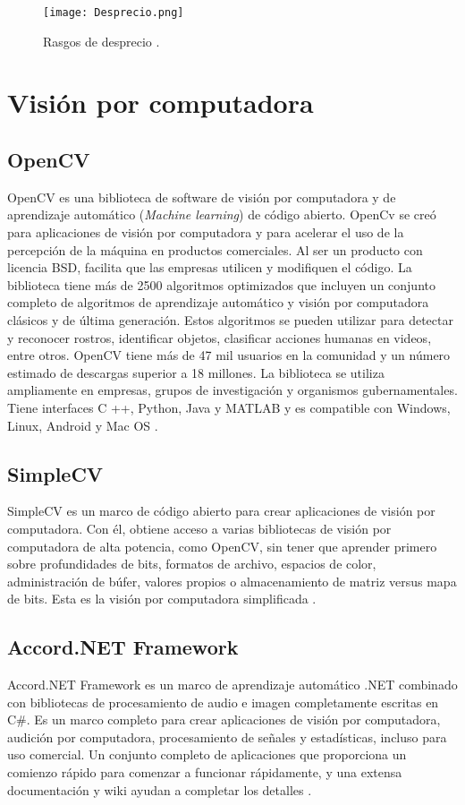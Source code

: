 \begin{figure}[h]
    \centering
    \texttt{[image: Desprecio.png]}
    \caption{Rasgos de desprecio \cite{ReconocerLasEmociones}.}
    \label{fig:Desprecio}
\end{figure}

\section*{Visión por computadora}
\subsection*{OpenCV}
OpenCV es una biblioteca de software de visión por computadora y de aprendizaje automático (\textit{Machine learning}) de código abierto. OpenCv se creó para aplicaciones de visión por computadora y para acelerar el uso de la percepción de la máquina en productos comerciales. Al ser un producto con licencia BSD, facilita que las empresas utilicen y modifiquen el código. La biblioteca tiene más de 2500 algoritmos optimizados que incluyen un conjunto completo de algoritmos de aprendizaje automático y visión por computadora clásicos y de última generación. Estos algoritmos se pueden utilizar para detectar y reconocer rostros, identificar objetos, clasificar acciones humanas en videos, entre otros. OpenCV tiene más de 47 mil usuarios en la comunidad y un número estimado de descargas superior a 18 millones. La biblioteca se utiliza ampliamente en empresas, grupos de investigación y organismos gubernamentales. Tiene interfaces C ++, Python, Java y MATLAB y es compatible con Windows, Linux, Android y Mac OS \cite{OpenCV}.

\subsection*{SimpleCV}
SimpleCV es un marco de código abierto para crear aplicaciones de visión por computadora. Con él, obtiene acceso a varias bibliotecas de visión por computadora de alta potencia, como OpenCV, sin tener que aprender primero sobre profundidades de bits, formatos de archivo, espacios de color, administración de búfer, valores propios o almacenamiento de matriz versus mapa de bits. Esta es la visión por computadora simplificada \cite{SimpleCV}.

\subsection*{Accord.NET Framework}
Accord.NET Framework es un marco de aprendizaje automático .NET combinado con bibliotecas de procesamiento de audio e imagen completamente escritas en C\#. Es un marco completo para crear aplicaciones de visión por computadora, audición por computadora, procesamiento de señales y estadísticas, incluso para uso comercial. Un conjunto completo de aplicaciones que proporciona un comienzo rápido para comenzar a funcionar rápidamente, y una extensa documentación y wiki ayudan a completar los detalles \cite{Accord.NET}.


